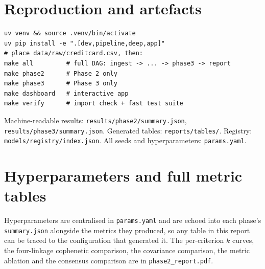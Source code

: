 \documentclass[11pt, a4paper]{article}
\begin{document}
\appendix
\section{Reproduction and artefacts}

\begin{verbatim}
uv venv && source .venv/bin/activate
uv pip install -e ".[dev,pipeline,deep,app]"
# place data/raw/creditcard.csv, then:
make all         # full DAG: ingest -> ... -> phase3 -> report
make phase2      # Phase 2 only
make phase3      # Phase 3 only
make dashboard   # interactive app
make verify      # import check + fast test suite
\end{verbatim}

Machine-readable results: \texttt{results/phase2/summary.json},
\texttt{results/phase3/summary.json}. Generated tables:
\texttt{reports/tables/}. Registry: \texttt{models/registry/index.json}. All
seeds and hyperparameters: \texttt{params.yaml}.

\section{Hyperparameters and full metric tables}
Hyperparameters are centralised in \texttt{params.yaml} and are echoed into each
phase's \texttt{summary.json} alongside the metrics they produced, so any table
in this report can be traced to the configuration that generated it. The
per-criterion $k$ curves, the four-linkage cophenetic comparison, the covariance
comparison, the metric ablation and the consensus comparison are in
\texttt{phase2\_report.pdf}.
\end{document}
